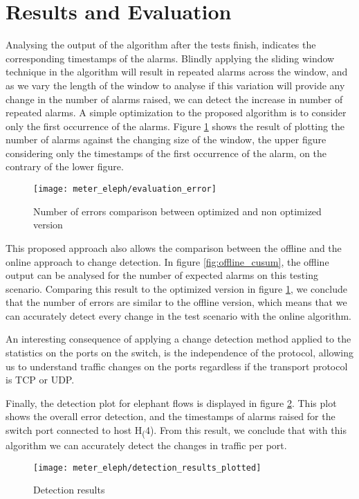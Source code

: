 \section {Results and Evaluation} \label{sec:change_result}

Analysing the output of the algorithm after the tests finish, indicates the corresponding timestamps of the alarms. Blindly applying the sliding window technique
in the algorithm will result in repeated alarms across the window, and as we vary the length of the window to analyse if this variation will provide any change in the
number of alarms raised, we can detect the increase in number of repeated alarms. A simple optimization to the proposed algorithm is to consider only the first
occurrence of the alarms. Figure \ref{fig:errors_comparaison} shows the result of plotting the number of alarms against the changing size of the window, the
upper figure considering only the timestamps of the first occurrence of the alarm, on the contrary of the lower figure.

\begin{figure} [H]
    \centering
    \texttt{[image: meter\_eleph/evaluation\_error]}
    \caption {Number of errors comparison between optimized and non optimized version}
    \label{fig:errors_comparaison}
\end{figure} 

\par This proposed approach also allows the comparison between the offline and the online approach to change detection. In figure \ref{fig:offline_cusum}, the 
offline output can be analysed for the number of expected alarms on this testing scenario. Comparing this result to the optimized version in figure 
\ref{fig:errors_comparaison}, we conclude that the number of errors are similar to the offline version, which means that we can accurately detect every change in
the test scenario with the online algorithm.

\par An interesting consequence of applying a change detection method applied to the statistics on the ports on the switch, is the independence of the protocol,
allowing us to understand traffic changes on the ports regardless if the transport protocol is TCP or UDP.

\par Finally, the detection plot for elephant flows is displayed in figure \ref{fig:color_plot}. This plot shows the overall error detection, and the timestamps
of alarms raised for the switch port connected to host H\textsubscript(4). From this result, we conclude that with this algorithm we can accurately detect the 
changes in traffic per port.

\begin{figure}
    \centering
    \texttt{[image: meter\_eleph/detection\_results\_plotted]}
    \caption{Detection results}
    \label{fig:color_plot}
\end{figure}
